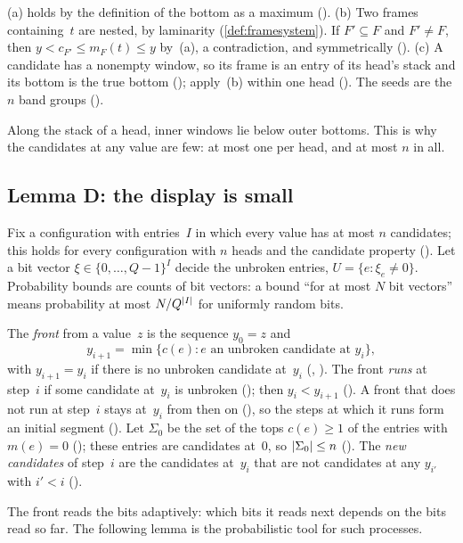 \begin{outline}
(a) holds by the definition of the bottom as a maximum (). (b) Two frames containing~$t$
are nested, by laminarity (\cref{def:framesystem}). If $F'\subseteq F$ and $F'\ne F$, then $y<c_{F'}\le m_F(t)\le y$ by~(a), a
contradiction, and symmetrically (). (c) A candidate has a nonempty window, so its frame
is an entry of its head's stack and its bottom is the true bottom (); apply~(b) within one head
(). The seeds are the $n$ band groups ().
\end{outline}

Along the stack of a head, inner windows lie below outer bottoms. This is why the candidates at any value are few: at most one per
head, and at most $n$ in all.

\subsection{Lemma D: the display is small}\label{sec:displays-D}

Fix a configuration with entries~$I$ in which every value has at most $n$ candidates; this holds for every configuration with
$n$ heads and the candidate property (). Let a bit vector $\xi\in\{0,\dots,Q-1\}^I$ decide the unbroken entries,
$U=\{e:\xi_e\ne0\}$. Probability bounds are counts of bit vectors: a bound ``for at most $N$ bit vectors'' means probability at
most $N/Q^{\lvert I \rvert}$ for uniformly random bits.

The \emph{front} from a value~$z$ is the sequence $y_0=z$ and
\[
  y_{i+1}=\min\{c(e):e\text{ an unbroken candidate at }y_i\},
\]
with $y_{i+1}=y_i$ if there is no unbroken candidate at~$y_i$ (, ). The front \emph{runs} at step~$i$
if some candidate at~$y_i$ is unbroken (); then $y_i<y_{i+1}$ (). A front that does not run at
step~$i$ stays at~$y_i$ from then on (), so the steps at which it runs form an initial segment
(). Let $\Sigma_0$ be the set of the tops $c(e)\ge1$ of the entries with $m(e)=0$ (); these
entries are candidates at~$0$, so $\lvert \Sigma_0 \rvert\le n$ (). The \emph{new candidates} of step~$i$ are the
candidates at~$y_i$ that are not candidates at any $y_{i'}$ with $i'<i$ ().

The front reads the bits adaptively: which bits it reads next depends on the bits read so far. The following lemma is the
probabilistic tool for such processes.

